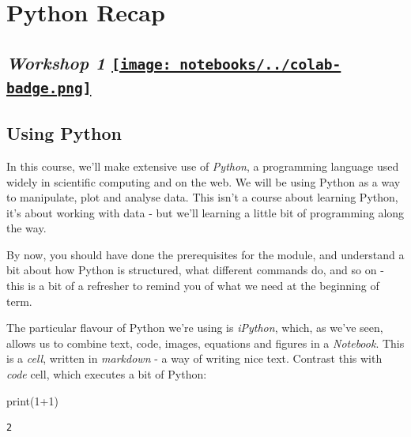 \documentclass[
  letterpaper,
  DIV=11,
  numbers=noendperiod]{scrreprt}
\newenvironment{Shaded}{\begin{snugshade}}{\end{snugshade}}
\newcommand{\BuiltInTok}[1]{\textcolor[rgb]{0.00,0.23,0.31}{#1}}
\newcommand{\DecValTok}[1]{\textcolor[rgb]{0.68,0.00,0.00}{#1}}
\newcommand{\NormalTok}[1]{\textcolor[rgb]{0.00,0.23,0.31}{#1}}
\newcommand{\OperatorTok}[1]{\textcolor[rgb]{0.37,0.37,0.37}{#1}}
\begin{document}

\hypertarget{python-recap}{%
\chapter{Python Recap}\label{python-recap}}

\hypertarget{workshop-1-open-in-colab}{%
\section[\emph{Workshop 1} ]{\texorpdfstring{\emph{Workshop 1}
\href{https://colab.research.google.com/github/oballinger/QM2/blob/main/notebooks/W01.\%20Python\%20Recap.ipynb}{\protect\texttt{[image: notebooks/../colab-badge.png]}}}{Workshop 1 Open In Colab}}\label{workshop-1-open-in-colab}}

\hypertarget{using-python}{%
\section{Using Python}\label{using-python}}

In this course, we'll make extensive use of \emph{Python}, a programming
language used widely in scientific computing and on the web. We will be
using Python as a way to manipulate, plot and analyse data. This isn't a
course about learning Python, it's about working with data - but we'll
learning a little bit of programming along the way.

By now, you should have done the prerequisites for the module, and
understand a bit about how Python is structured, what different commands
do, and so on - this is a bit of a refresher to remind you of what we
need at the beginning of term.

The particular flavour of Python we're using is \emph{iPython}, which,
as we've seen, allows us to combine text, code, images, equations and
figures in a \emph{Notebook}. This is a \emph{cell}, written in
\emph{markdown} - a way of writing nice text. Contrast this with
\emph{code} cell, which executes a bit of Python:

\begin{Shaded}
\begin{Highlighting}[]
\BuiltInTok{print}\NormalTok{(}\DecValTok{1}\OperatorTok{+}\DecValTok{1}\NormalTok{)}
\end{Highlighting}
\end{Shaded}

\begin{verbatim}
2
\end{verbatim}
\end{document}
